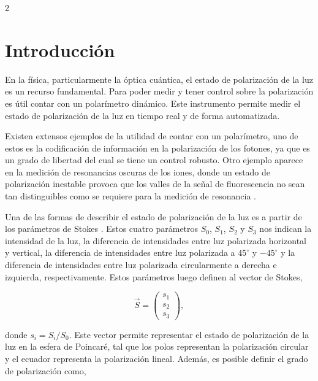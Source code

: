 \documentclass[11pt,a4paper]{article}
\begin{document}
\begin{multicols}{2}

\section{Introducción}
En la física, particularmente la óptica cuántica, el estado de polarización de la luz es un recurso fundamental. Para poder medir y tener control sobre la polarización es útil contar con un polarímetro dinámico. Este instrumento permite medir el estado de polarización de la luz en tiempo real y de forma automatizada. 

Existen extensos ejemplos de la utilidad de contar con un polarímetro, uno de estos es la codificación de información en la polarización de los fotones, ya que es un grado de libertad del cual se tiene un control robusto. Otro ejemplo aparece en la medición de resonancias oscuras de los iones, donde un estado de polarización inestable provoca que los valles de la señal de fluorescencia no sean tan distinguibles como se requiere para la medición de resonancia \cite{dark_resonance}.

Una de las formas de describir el estado de polarización de la luz es a partir de los parámetros de Stokes \cite{stokes}. Estos cuatro parámetros $S_0$, $S_1$, $S_2$ y $S_3$ nos indican la intensidad de la luz, la diferencia de intensidades entre luz polarizada horizontal y vertical, la diferencia de intensidades entre luz polarizada a $45^\circ$ y $-45^\circ$ y la diferencia de intensidades entre luz polarizada circularmente a derecha e izquierda, respectivamente. Estos parámetros luego definen al vector de Stokes,

\begin{equation*}
\vec{S} = \begin{pmatrix}
s_1 \\
s_2 \\
s_3 
\end{pmatrix},
\end{equation*}

\noindent donde $s_i = S_i/S_0$. Este vector permite representar el estado de polarización de la luz en la esfera de Poincaré, tal que los polos representan la polarización circular y el ecuador representa la polarización lineal. Además, es posible definir el grado de polarización como,



\end{multicols}
\end{document}
